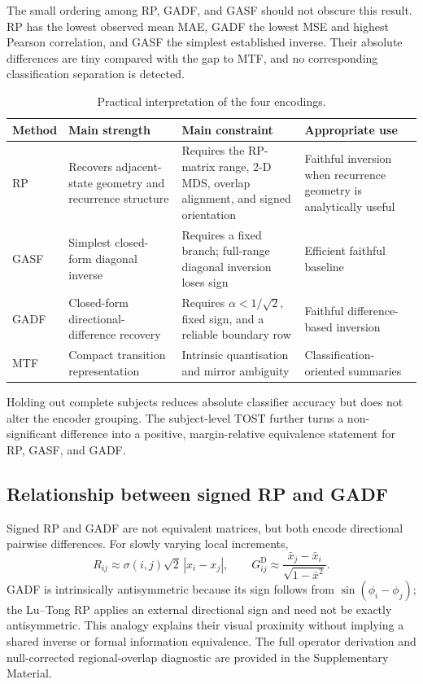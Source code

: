\documentclass[10pt,a4paper,parskip=half-]{scrartcl}
\begin{document}
The small ordering among RP, GADF, and GASF should not obscure this result. RP has the lowest observed mean MAE, GADF the lowest MSE and highest Pearson correlation, and GASF the simplest established inverse. Their absolute differences are tiny compared with the gap to MTF, and no corresponding classification separation is detected.

\begin{table}[!htbp]
\centering
\caption{Practical interpretation of the four encodings.}
\label{tab:discussion_method_roles}
\small
\begin{tabular}{@{}L{0.09\textwidth}L{0.28\textwidth}L{0.32\textwidth}L{0.24\textwidth}@{}}
\toprule
Method & Main strength & Main constraint & Appropriate use \\
\midrule
RP & Recovers adjacent-state geometry and recurrence structure & Requires the RP-matrix range, 2-D MDS, overlap alignment, and signed orientation & Faithful inversion when recurrence geometry is analytically useful \\
GASF & Simplest closed-form diagonal inverse & Requires a fixed branch; full-range diagonal inversion loses sign & Efficient faithful baseline \\
GADF & Closed-form directional-difference recovery & Requires \(\alpha<1/\sqrt2\), fixed sign, and a reliable boundary row & Faithful difference-based inversion \\
MTF & Compact transition representation & Intrinsic quantisation and mirror ambiguity & Classification-oriented summaries \\

\bottomrule
\end{tabular}
\end{table}

Holding out complete subjects reduces absolute classifier accuracy but does not alter the encoder grouping. The subject-level TOST further turns a non-significant difference into a positive, margin-relative equivalence statement for RP, GASF, and GADF.

\subsection{Relationship between signed RP and GADF}
\label{sec:disc_structural}

Signed RP and GADF are not equivalent matrices, but both encode directional pairwise differences. For slowly varying local increments,
\[
R_{ij}\approx \sigma(i,j)\sqrt2\,|x_i-x_j|,
\qquad
G^{\mathrm D}_{ij}\approx
\frac{\bar x_j-\bar x_i}{\sqrt{1-\bar x^2}}.
\]
GADF is intrinsically antisymmetric because its sign follows from \(\sin(\phi_i-\phi_j)\); the Lu--Tong RP applies an external directional sign and need not be exactly antisymmetric. This analogy explains their visual proximity without implying a shared inverse or formal information equivalence. The full operator derivation and null-corrected regional-overlap diagnostic are provided in the Supplementary Material.
\end{document}

